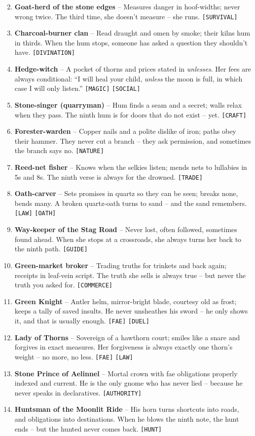 \begin{enumerate}
\setcounter{enumi}{1}
\item \textbf{Goat-herd of the stone edges} -- Measures danger in hoof-widths; never wrong twice. The third time, she doesn't measure -- she runs. \texttt{[SURVIVAL]}
\item \textbf{Charcoal-burner clan} -- Read draught and omen by smoke; their kilns hum in thirds. When the hum stops, someone has asked a question they shouldn't have. \texttt{[DIVINATION]}
\item \textbf{Hedge-witch} -- A pocket of thorns and prices stated in \emph{unlesses}. Her fees are always conditional: ``I will heal your child, \emph{unless} the moon is full, in which case I will only listen.'' \texttt{[MAGIC]} \texttt{[SOCIAL]}
\item \textbf{Stone-singer (quarryman)} -- Hum finds a seam and a secret; walls relax when they pass. The ninth hum is for doors that do not exist -- yet. \texttt{[CRAFT]}
\item \textbf{Forester-warden} -- Copper nails and a polite dislike of iron; paths obey their hammer. They never cut a branch -- they ask permission, and sometimes the branch says no. \texttt{[NATURE]}
\item \textbf{Reed-net fisher} -- Knows when the selkies listen; mends nets to lullabies in 5s and 8s. The ninth verse is always for the drowned. \texttt{[TRADE]}
\item \textbf{Oath-carver} -- Sets promises in quartz so they can be seen; breaks none, bends many. A broken quartz-oath turns to sand -- and the sand remembers. \texttt{[LAW]} \texttt{[OATH]}
\item \textbf{Way-keeper of the Stag Road} -- Never lost, often followed, sometimes found ahead. When she stops at a crossroads, she always turns her back to the ninth path. \texttt{[GUIDE]}
\item \textbf{Green-market broker} -- Trading truths for trinkets and back again; receipts in leaf-vein script. The truth she sells is always true -- but never the truth you asked for. \texttt{[COMMERCE]}
\item[J] \textbf{Green Knight} -- Antler helm, mirror-bright blade, courtesy old as frost; keeps a tally of saved insults. He never unsheathes his sword -- he only shows it, and that is usually enough. \texttt{[FAE]} \texttt{[DUEL]}
\item[Q] \textbf{Lady of Thorns} -- Sovereign of a hawthorn court; smiles like a snare and forgives in exact measures. Her forgiveness is always exactly one thorn's weight -- no more, no less. \texttt{[FAE]} \texttt{[LAW]}
\item[K] \textbf{Stone Prince of Aelinnel} -- Mortal crown with fae obligations properly indexed and current. He is the only gnome who has never lied -- because he never speaks in declaratives. \texttt{[AUTHORITY]}
\item[A] \textbf{Huntsman of the Moonlit Ride} -- His horn turns shortcuts into roads, and obligations into destinations. When he blows the ninth note, the hunt ends -- but the hunted never comes back. \texttt{[HUNT]}
\end{enumerate}

